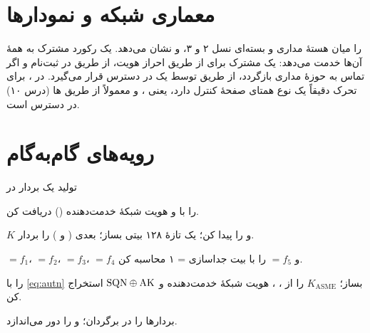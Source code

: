 \documentclass[11pt,a4paper]{article}
\begin{document}
\begin{acnfigure}
  \caption{زمان قطعی سالانه بر حسب عدم دسترس‌پذیری یک سایت برای چهار گزینهٔ استقرار (با فرض خرابی‌های مستقل).}
  \label{fig:avail}
\end{acnfigure}

\section{معماری شبکه و نمودارها}
  را میان هستهٔ مداری و بسته‌ای نسل ۲ و ۳،  و  نشان می‌دهد. یک رکورد مشترک
به همهٔ آن‌ها خدمت می‌دهد: یک مشترک  برای  از طریق  احراز هویت، از طریق  در
 ثبت‌نام و اگر تماس به حوزهٔ مداری بازگردد، از طریق  توسط یک  در دسترس قرار می‌گیرد. در
،  برای تحرک دقیقاً یک نوع همتای صفحهٔ کنترل دارد، یعنی ، و معمولاً از طریق ها
(درس ۱۰) در دسترس است.

\section{رویه‌های گام‌به‌گام}

\begin{procedurebox}{تولید یک بردار  در }\label{proc:av}
\begin{steps}
  \item {} را با  و هویت شبکهٔ خدمت‌دهنده () دریافت کن.
  \item $K$ و  را پیدا کن؛ یک  تازهٔ ۱۲۸ بیتی بساز؛  بعدی ( و ) را بردار.
  \item {} $= f_1$،  $= f_2$،  $= f_3$،  $= f_4$ و  $= f_5$ را با بیت جداسازی
         = ۱ محاسبه کن.
  \item {} را با \cref{eq:autn} بساز؛ $K_{\mathrm{ASME}}$ را از ، ، هویت شبکهٔ خدمت‌دهنده و
        $\mathrm{SQN}\oplus\mathrm{AK}$ استخراج کن.
  \item بردارها را در  برگردان؛   و  را دور می‌اندازد.
\end{steps}
\end{procedurebox}
\end{document}
